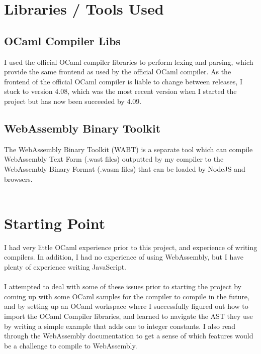 
\section{Libraries / Tools Used}
\subsection{OCaml Compiler Libs}
I used the official OCaml compiler \cite{OCaml} libraries to perform lexing and parsing, which provide the same frontend as used by the official OCaml compiler. As the frontend of the official OCaml compiler is liable to change between releases, I stuck to version 4.08, which was the most recent version when I started the project but has now been succeeded by 4.09.

\subsection{WebAssembly Binary Toolkit}
The WebAssembly Binary Toolkit \cite{Wabt} (WABT)  is a separate tool which can compile WebAssembly Text Form (.wast files) outputted by my compiler to the WebAssembly Binary Format (.wasm files) that can be loaded by NodeJS and browsers.
\\\\

\section{Starting Point}
I had very little OCaml experience prior to this project, and experience of writing compilers. In addition, I had no experience of using WebAssembly, but I have plenty of experience writing JavaScript.
\\\\
I attempted to deal with some of these issues prior to starting the project by coming up with some OCaml samples for the compiler to compile in the future, and by setting up an OCaml workspace where I successfully figured out how to import the OCaml Compiler libraries, and learned to navigate the AST they use by writing a simple example that adds one to integer constants. I also read through the WebAssembly documentation to get a sense of which features would be a challenge to compile to WebAssembly.